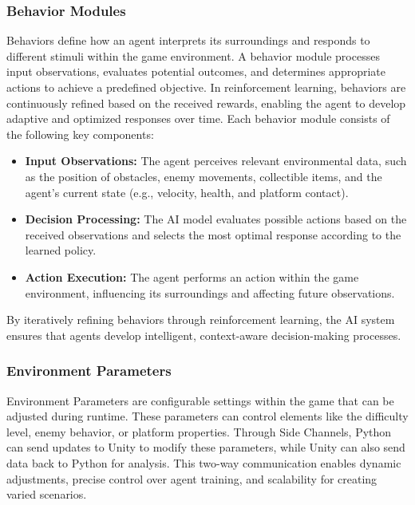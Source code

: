 \documentclass[12pt,oneside,openright,a4paper]{cpe-english-project}
\begin{document}
\subsubsection{Behavior Modules}
Behaviors define how an agent interprets its surroundings and responds to different stimuli within the game environment. A behavior module processes input observations, evaluates potential outcomes, and determines appropriate actions to achieve a predefined objective. In reinforcement learning, behaviors are continuously refined based on the received rewards, enabling the agent to develop adaptive and optimized responses over time.
Each behavior module consists of the following key components:
\begin{itemize}
\item  \textbf{Input Observations:} The agent perceives relevant environmental data, such as the position of obstacles, enemy movements, collectible items, and the agent’s current state (e.g., velocity, health, and platform contact).
\item  \textbf{Decision Processing:} The AI model evaluates possible actions based on the received observations and selects the most optimal response according to the learned policy.
\item  \textbf{Action Execution:} The agent performs an action within the game environment, influencing its surroundings and affecting future observations.
\end{itemize}
By iteratively refining behaviors through reinforcement learning, the AI system ensures that agents develop intelligent, context-aware decision-making processes.
\subsubsection{Environment Parameters}
Environment Parameters are configurable settings within the game that can be adjusted during runtime. These parameters can control elements like the difficulty level, enemy behavior, or platform properties. Through Side Channels, Python can send updates to Unity to modify these parameters, while Unity can also send data back to Python for analysis. This two-way communication enables dynamic adjustments, precise control over agent training, and scalability for creating varied scenarios.
\end{document}
